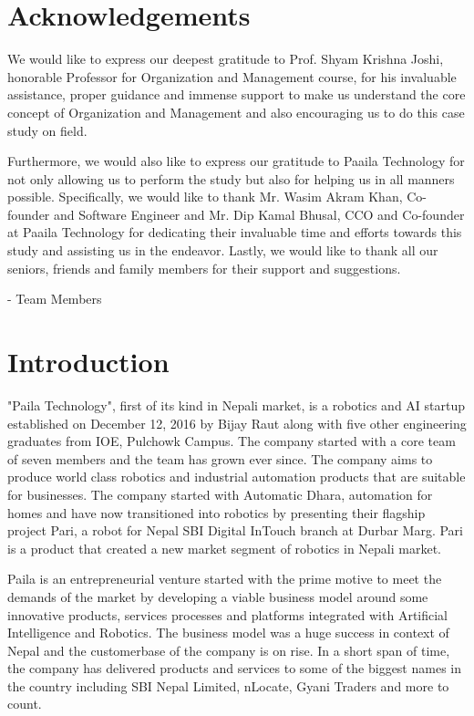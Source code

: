 \documentclass[12pt,a4paper]{scrreprt}
\begin{document}

\chapter*{Acknowledgements}
\thispagestyle{empty}
We would like to express our deepest gratitude to Prof. Shyam Krishna Joshi, honorable Professor for Organization and Management course, for his invaluable assistance, proper guidance and immense support to make us understand the core concept of Organization and Management and also encouraging us to do this case study on field.

Furthermore, we would also like to express our gratitude to Paaila Technology for not only allowing us to perform the study but also for helping us in all manners possible. Specifically, we would like to thank Mr. Wasim Akram Khan, Co-founder and Software Engineer and Mr. Dip Kamal Bhusal, CCO and Co-founder at Paaila Technology for dedicating their invaluable time and efforts towards this study and assisting us in the endeavor. Lastly, we would like to thank all our seniors, friends and family members for their support and suggestions.

- Team Members

\clearpage
\tableofcontents
\listoffigures
\listoftables
\clearpage
{}

\chapter{Introduction}
"Paila Technology", first of its kind in Nepali market, is a robotics and AI startup established on December 12, 2016 by Bijay Raut along with five other engineering graduates from IOE, Pulchowk Campus. The company started with a core team of seven members and the team has grown ever since. The company aims to produce world class robotics and industrial automation products that are suitable for businesses.
The company started with Automatic Dhara, automation for homes and have now transitioned into robotics by presenting their flagship project Pari, a robot for Nepal SBI Digital InTouch branch at Durbar Marg. Pari is a product that created a new market segment of robotics in Nepali market.

Paila is an entrepreneurial venture started with the prime motive to meet the demands of the market by developing a viable business model around some innovative products, services processes and platforms integrated with Artificial Intelligence and Robotics. The business model was a huge success in context of Nepal and the customerbase of the company is on rise. In a short span of time, the company has delivered products and services to some of the biggest names in the country including SBI Nepal Limited, nLocate, Gyani Traders and more to count.
\end{document}
